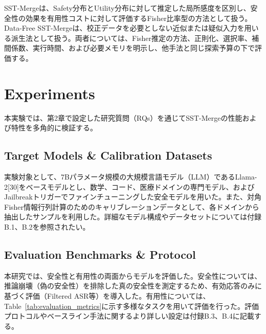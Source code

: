 \documentclass{article}
\begin{document}
SST-Mergeは、Safety分布とUtility分布に対して推定した局所感度を区別し、安全性の効果を有用性コストに対して評価するFisher比率型の方法として扱う。Data-Free SST-Mergeは、校正データを必要としない近似または疑似入力を用いる派生法として扱う。両者については、Fisher推定の方法、正則化、選択率、補間係数、実行時間、および必要メモリを明示し、他手法と同じ探索予算の下で評価する。

\section{Experiments}

本実験では、第2章で設定した研究質問（RQs）を通じてSST-Mergeの性能および特性を多角的に検証する。

\subsection{Target Models \& Calibration Datasets}
実験対象として、7Bパラメータ規模の大規模言語モデル（LLM）であるLlama-2[30]をベースモデルとし、数学、コード、医療ドメインの専門モデル、およびJailbreakトリガーでファインチューニングした安全モデルを用いた。また、対角Fisher情報行列計算のためのキャリブレーションデータとして、各ドメインから抽出したサンプルを利用した。詳細なモデル構成やデータセットについては付録B.1、B.2を参照されたい。

\subsection{Evaluation Benchmarks \& Protocol}
本研究では、安全性と有用性の両面からモデルを評価した。安全性については、推論崩壊（偽の安全性）を排除した真の安全性を測定するため、有効応答のみに基づく評価（Filtered ASR等）を導入した。有用性については、Table~\ref{tab:evaluation_metrics}に示す多様なタスクを用いて評価を行った。評価プロトコルやベースライン手法に関するより詳しい設定は付録B.3、B.4に記載する。
\end{document}
